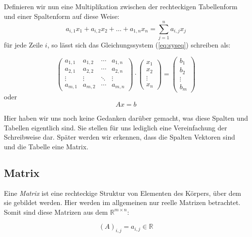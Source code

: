 Definieren wir nun eine Multiplikation zwischen der rechteckigen Tabellenform und einer Spaltenform auf diese Weise:
\begin{equation*}
a_{i,1}x_1 + a_{i,2}x_2 + \dots + a_{1,n}x_n = \sum_{j=1}^{n} a_{i,j}x_j
\end{equation*}
für jede Zeile $i$, so lässt sich das Gleichungssystem (\ref{eq:syseq}) schreiben als:

\begin{equation*}
\begin{pmatrix}
a_{1,1} & a_{1,2} & \cdots & a_{1,n} \\
a_{2,1} & a_{2,2} & \cdots & a_{2,n} \\
\vdots & \vdots & \ddots & \vdots \\
a_{m,1} & a_{m,2} & \cdots & a_{m,n}
\end{pmatrix} \cdot \begin{pmatrix}
x_1 \\
x_2 \\
\vdots \\
x_n
\end{pmatrix} = \begin{pmatrix}
b_1 \\
b_2 \\
\vdots \\
b_m
\end{pmatrix}
\end{equation*}
oder
\begin{equation*}
Ax=b
\end{equation*}

Hier haben wir uns noch keine Gedanken darüber gemacht, was diese Spalten und Tabellen eigentlich sind. Sie stellen für uns lediglich eine Vereinfachung der Schreibweise dar. Später werden wir erkennen, dass die Spalten Vektoren sind und die Tabelle eine Matrix.


\subsection{Matrix}

\begin{definition}
Eine \emph{Matrix}  ist eine rechteckige Struktur von Elementen des Körpers, über dem sie gebildet werden. Hier werden im allgemeinen nur reelle Matrizen betrachtet. Somit sind diese Matrizen aus dem $\mathbb{R}^{m\times n}$:
\end{definition}

\begin{equation*}
(A)_{i,j} = a_{i,j} \in \mathbb{R}
\end{equation*}

